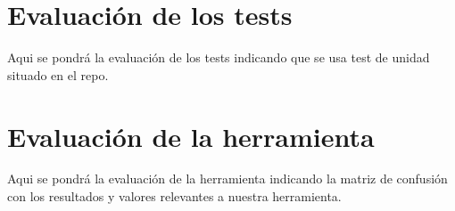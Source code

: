 \section{Evaluación de los tests}

Aqui se pondrá la evaluación de los tests indicando que se usa test de unidad situado en el repo.
\section{Evaluación de la herramienta}

Aqui se pondrá la evaluación de la herramienta indicando la matriz de confusión con los resultados y valores relevantes a nuestra herramienta.